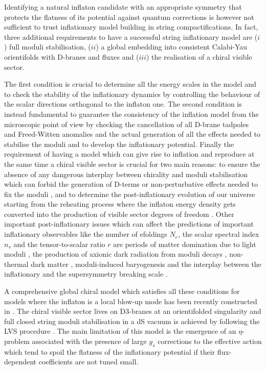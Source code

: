 \documentclass[11pt,a4paper]{article}
\begin{document}
Identifying a natural inflaton candidate with an appropriate symmetry that protects the flatness of its potential against quantum corrections is however not sufficient to trust inflationary model building in string compactifications. In fact, three additional requirements to have a successful string inflationary model are ($i$) full moduli stabilisation, ($ii$) a global embedding into consistent Calabi-Yau orientifolds with D-branes and fluxes and ($iii$) the realisation of a chiral visible sector. 

The first condition is crucial to determine all the energy scales in the model and to check the stability of the inflationary dynamics by controlling the behaviour of the scalar directions orthogonal to the inflaton one. The second condition is instead fundamental to guarantee the consistency of the inflation model from the microscopic point of view by checking the cancellation of all D-brane tadpoles and Freed-Witten anomalies and the actual generation of all the effects needed to stabilise the moduli and to develop the inflationary potential. Finally the requirement of having a model which can give rise to inflation and reproduce at the same time a chiral visible sector is crucial for two main reasons: to ensure the absence of any dangerous interplay between chirality and moduli stabilisation which can forbid the generation of D-terms or non-perturbative effects needed to fix the moduli \cite{Blumenhagen:2007sm}, and to determine the post-inflationary evolution of our universe starting from the reheating process where the inflaton energy density gets converted into the production of visible sector degrees of freedom \cite{Green:2007gs, Brandenberger:2008kn, Barnaby:2009wr, Cicoli:2010ha}. Other important post-inflationary issues which can affect the predictions of important inflationary observables like the number of efoldings $N_e$, the scalar spectral index $n_s$ and the tensor-to-scalar ratio $r$ are periods of matter domination due to light moduli \cite{Dutta:2014tya, Cicoli:2016olq, Bhattacharya:2017ysa}, the production of axionic dark radiation from moduli decays \cite{Cicoli:2012aq, Higaki:2012ar, Hebecker:2014gka, Cicoli:2015bpq}, non-thermal dark matter \cite{Acharya:2008bk, Allahverdi:2013noa, Aparicio:2015sda}, moduli-induced baryogenesis \cite{Kane:2011ih, Allahverdi:2016yws} and the interplay between the inflationary and the supersymmetry breaking scale \cite{Conlon:2008cj, He:2010uk, Antusch:2011wu, Buchmuller:2014pla}.

A comprehensive global chiral model which satisfies all these conditions for models where the inflaton is a local blow-up mode \cite{Conlon:2005jm} has been recently constructed in \cite{Cicoli:2017shd}. The chiral visible sector lives on D3-branes at an orientifolded singularity and full closed string moduli stabilisation in a dS vacuum is achieved by following the LVS procedure \cite{Balasubramanian:2005zx, Cicoli:2008va}. The main limitation of this model is the emergence of an $\eta$-problem associated with the presence of large $g_s$ corrections to the effective action which tend to spoil the flatness of the inflationary potential if their flux-dependent coefficients are not tuned small. 
\end{document}
